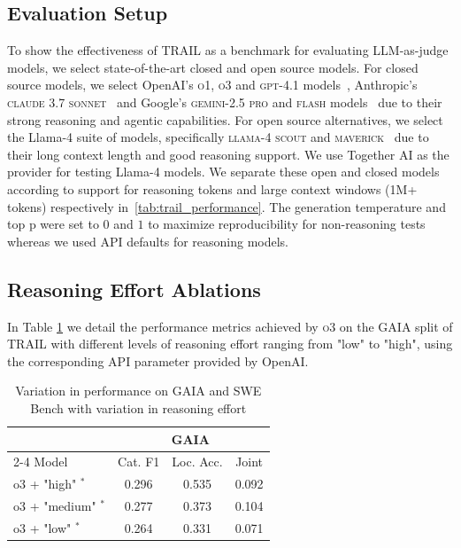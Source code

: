 \documentclass[11pt]{article}
\begin{document}
\subsection{Evaluation Setup}
\label{appendix_subsec:evaluation_setup_full}
To show the effectiveness of TRAIL as a benchmark for evaluating LLM-as-judge models, we select state-of-the-art closed and open source models. For closed source models, we select OpenAI's \textsc{o1}, \textsc{o3} and \textsc{gpt-4.1} models~\cite{openai_o1, openai_o3_o4_mini, openai_gpt4_1}, Anthropic's \textsc{claude 3.7 sonnet}~\cite{anthropic_claude_3_7_sonnet} and Google's \textsc{gemini-2.5 pro} and \textsc{flash} models~\cite{google_deepmind_gemini_2025} due to their strong reasoning and agentic capabilities. For open source alternatives, we select the Llama-4 suite of models, specifically \textsc{llama-4 scout} and \textsc{maverick}~\cite{meta_llama4_multimodal} due to their long context length and good reasoning support. We use Together AI as the provider for testing Llama-4 models. We separate these open and closed models according to support for reasoning tokens and large context windows (1M+ tokens) respectively in~\autoref{tab:trail_performance}. The generation temperature and top p were set to $0$ and $1$ to maximize reproducibility for non-reasoning tests whereas we used API defaults for reasoning models.

\subsection{Reasoning Effort Ablations}
\label{appendix_subsec:reasoning_effort}
In Table \ref{tab:trail_reasoning_effort_performance_ablation} we detail the performance metrics achieved by \textsc{o3} on the GAIA split of TRAIL with different levels of reasoning effort ranging from "low" to "high", using the corresponding API parameter provided by OpenAI.
\begin{table}
    \centering
    \small
    \setlength{\tabcolsep}{4pt}
    \begin{tabular}{l c c c}
        \toprule
         & \multicolumn{3}{c}{GAIA}  \\
         \cmidrule(lr){2-4} 
         Model & Cat. F1 & Loc. Acc. & Joint   \\\midrule
         o3 + "high" $^{*}$ & 0.296 & 0.535 & 0.092   \\
         o3 + "medium" $^{*}$ & 0.277 & 0.373 & 0.104   \\
         o3 + "low" $^{*}$ & 0.264 & 0.331 & 0.071  \\
         \bottomrule
    \end{tabular}
    \caption{Variation in performance on GAIA and SWE Bench with variation in reasoning effort}
    \label{tab:trail_reasoning_effort_performance_ablation}
\end{table}
\end{document}
